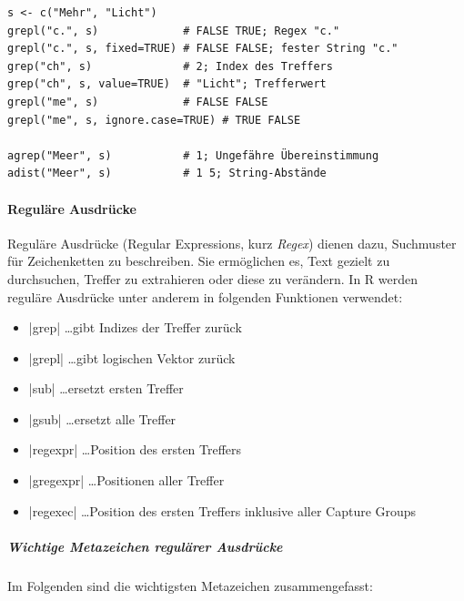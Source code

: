 \documentclass[10pt,twocolumn]{scrartcl}
\renewcommand{\lstinline}{\mycoloredinline}
\begin{document}
\begin{lstlisting}
s <- c("Mehr", "Licht")
grepl("c.", s)             # FALSE TRUE; Regex "c."
grepl("c.", s, fixed=TRUE) # FALSE FALSE; fester String "c."
grep("ch", s)              # 2; Index des Treffers
grep("ch", s, value=TRUE)  # "Licht"; Trefferwert
grepl("me", s)             # FALSE FALSE
grepl("me", s, ignore.case=TRUE) # TRUE FALSE

agrep("Meer", s)           # 1; Ungefähre Übereinstimmung
adist("Meer", s)           # 1 5; String-Abstände
\end{lstlisting}

\paragraph{Reguläre Ausdrücke}

Reguläre Ausdrücke (Regular Expressions, kurz \emph{Regex}) dienen dazu, Suchmuster für Zeichenketten zu beschreiben. Sie ermöglichen es, Text gezielt zu durchsuchen, Treffer zu extrahieren oder diese zu verändern. In R werden reguläre Ausdrücke unter anderem in folgenden Funktionen verwendet:

\begin{itemize}
\item \lstinline|grep| \dots gibt Indizes der Treffer zurück
\item \lstinline|grepl| \dots gibt logischen Vektor zurück
\item \lstinline|sub| \dots ersetzt ersten Treffer
\item \lstinline|gsub| \dots ersetzt alle Treffer
\item \lstinline|regexpr| \dots Position des ersten Treffers
\item \lstinline|gregexpr| \dots Positionen aller Treffer
\item \lstinline|regexec| \dots Position des ersten Treffers inklusive aller Capture Groups
\end{itemize}

\subparagraph{Wichtige Metazeichen regulärer Ausdrücke}

Im Folgenden sind die wichtigsten Metazeichen zusammengefasst:
\end{document}
